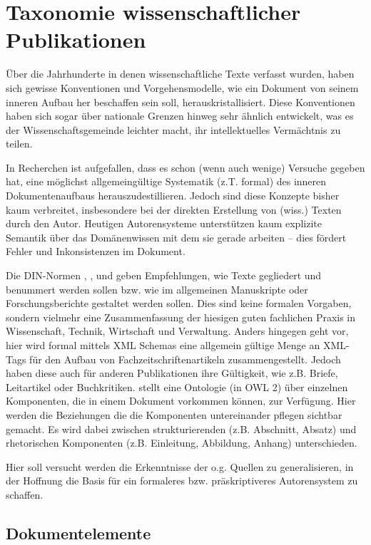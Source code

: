  
\section{Taxonomie wissenschaftlicher Publikationen}\label{}
 
Über die Jahrhunderte in denen wissenschaftliche Texte verfasst wurden, haben sich gewisse Konventionen und Vorgehensmodelle, wie ein Dokument von seinem inneren Aufbau her beschaffen sein soll, herauskristallisiert. Diese Konventionen haben sich sogar über nationale Grenzen hinweg sehr ähnlich entwickelt, was es der Wissenschaftsgemeinde leichter macht, ihr intellektuelles Vermächtnis zu teilen.

 
In Recherchen ist aufgefallen, dass es schon (wenn auch wenige) Versuche gegeben hat, eine möglichst allgemeingültige Systematik (z.T. formal) des inneren Dokumentenaufbaus herauszudestillieren. Jedoch sind diese Konzepte bisher kaum verbreitet, insbesondere bei der direkten Erstellung von (wiss.) Texten durch den Autor. Heutigen Autorensysteme unterstützen kaum explizite Semantik über das Domänenwissen mit dem sie gerade arbeiten -- dies fördert Fehler und Inkonsistenzen im Dokument.

 
Die DIN-Normen \citep{DIN1421}, \citep{DIN1422-1}, \citep{DIN1422-3} und \citep{DIN1422-4} geben Empfehlungen, wie Texte gegliedert und benummert werden sollen bzw. wie im allgemeinen Manuskripte oder Forschungsberichte gestaltet werden sollen. Dies sind keine formalen Vorgaben, sondern vielmehr eine Zusammenfassung der hiesigen guten fachlichen Praxis in Wissenschaft, Technik, Wirtschaft und Verwaltung. Anders hingegen geht \citep{NISO} vor, hier wird formal mittels XML Schemas eine allgemein gültige Menge an XML-Tags für den Aufbau von Fachzeitschriftenartikeln zusammengestellt. Jedoch haben diese auch für anderen Publikationen ihre Gültigkeit, wie z.B. Briefe, Leitartikel oder Buchkritiken. \citep{Peroni} stellt eine Ontologie (in OWL 2) über einzelnen Komponenten, die in einem Dokument vorkommen können, zur Verfügung. Hier werden die Beziehungen die die Komponenten untereinander pflegen sichtbar gemacht. Es wird dabei zwischen strukturierenden (z.B. Abschnitt, Absatz) und rhetorischen Komponenten (z.B. Einleitung, Abbildung, Anhang) unterschieden.

 
Hier soll versucht werden die Erkenntnisse der o.g. Quellen zu generalisieren, in der Hoffnung die Basis für ein formaleres bzw. präskriptiveres Autorensystem zu schaffen.

 
\subsection{Dokumentelemente}\label{dokumentelemente}
 
